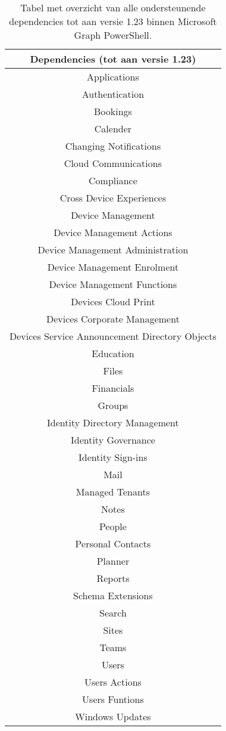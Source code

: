\begin{table}
    \small
    \centering
    \begin{tabular}{ |c| } 
        \hline
        \textbf{Dependencies (tot aan versie 1.23)} \\
        \hline
        Applications \\
        Authentication \\
        Bookings \\
        Calender \\
        Changing Notifications \\
        Cloud Communications \\
        Compliance \\
        Cross Device Experiences \\
        Device Management \\
        Device Management Actions \\
        Device Management Administration \\
        Device Management Enrolment \\
        Device Management Functions \\
        Devices Cloud Print \\
        Devices Corporate Management \\
        Devices Service Announcement
        Directory Objects \\
        Education \\
        Files \\
        Financials \\
        Groups \\
        Identity Directory Management \\
        Identity Governance \\
        Identity Sign-ins \\
        Mail \\
        Managed Tenants \\
        Notes \\
        People \\
        Personal Contacts \\
        Planner \\
        Reports \\
        Schema Extensions \\
        Search \\
        Sites \\
        Teams \\
        Users \\
        Users Actions \\
        Users Funtions \\
        Windows Updates \\
        \hline
    \end{tabular}
    \caption[Tabel Microsoft Graph dependencies]{Tabel met overzicht van alle ondersteunende dependencies tot aan versie 1.23 binnen Microsoft Graph PowerShell.}
    \label{MSGDT}
\end{table}

